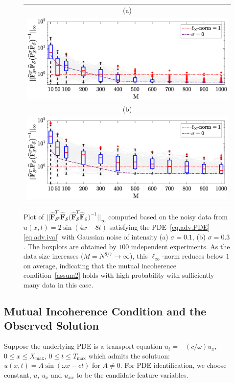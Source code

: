 \documentclass[a4paper,11pt]{article}
\begin{document}
\begin{figure}
\centering
\begin{tabular}{c}
(a)\\
\includegraphics[scale=0.5]{Figures/transportMIP_0_1.eps}\\
(b)\\
\includegraphics[scale=0.5]{Figures/transportMIP_0_3.eps}
\end{tabular}
\caption{Plot of $||\widehat{\mathbf{F}}_{\mathcal{S}^c}^T\widehat{\mathbf{F}}_{\mathcal{S}}\big(\widehat{\mathbf{F}}_{\mathcal{S}}^T\widehat{\mathbf{F}}_{\mathcal{S}}\big)^{-1}||_\infty$  computed based on the noisy data from $u(x,t)=2\sin(4x-8t)$ satisfying the PDE~\eqref{eq.adv.PDE}--\eqref{eq.adv.ival} with Gaussian noise of intensity (a) $\sigma=0.1$, (b) $\sigma=0.3$. The boxplots are obtained by $100$ independent experiments. As the data size increases ($M=N^{8/7}\to\infty$), this $\ell_\infty$-norm reduces below $1$ on average, indicating that the mutual incoherence condition~\eqref{assum2} holds with high probability with sufficiently many data in this case. }\label{fig.MIPtransport}
\end{figure}



\subsection{Mutual Incoherence Condition and the Observed Solution}
Suppose the underlying PDE is a transport equation $u_t=-(c/\omega)u_x$, $0\leq x\leq X_{\max}$, $0\leq t\leq T_{\max}$ which admits the solutuon: $u(x,t)=A\sin(\omega x-ct)$ for $A\neq 0$. For PDE identification, we choose constant, $u$, $u_x$ and $u_{xx}$ to be the candidate feature variables. 
\end{document}
